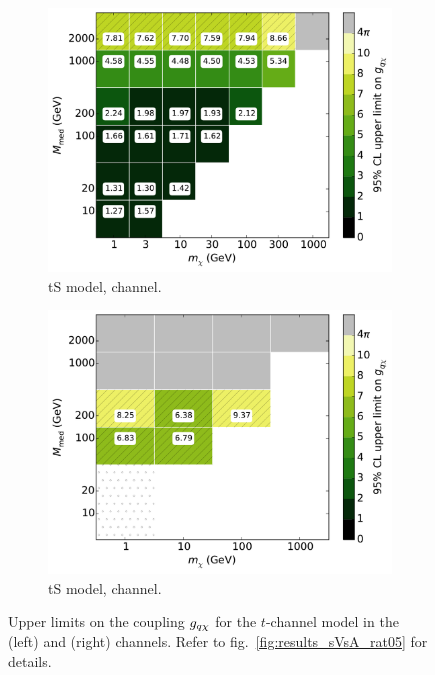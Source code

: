 \begin{figure}
  \centering
  \begin{subfigure}[t]{0.495\textwidth}
    \centering
    \includegraphics[width=1.\textwidth]{figures/grid_allpoints_TSD_rat1.pdf}
    \caption{tS model, \monoZ channel.}
  \end{subfigure}
  \begin{subfigure}[t]{0.495\textwidth}
    \centering
    \includegraphics[width=1.\textwidth]{figures/grid_basepoints_TSD_rat1_monoWZ.pdf}
    \caption{tS model, \monoWZ channel.}
  \end{subfigure}
  \caption{Upper limits on the coupling $g_{q \chi}$ for the $t$-channel model in the \monoZ (left) and \monoWZ (right) channels. Refer to fig.~\ref{fig:results_sVsA_rat05} for details.}
  \label{fig:results_tS}
\end{figure}
